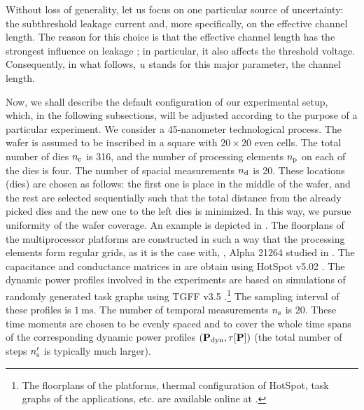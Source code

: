 Without loss of generality, let us focus on one particular source of uncertainty: the subthreshold leakage current and, more specifically, on the effective channel length. The reason for this choice is that the effective channel length has the strongest influence on leakage \cite{juan2011, juan2012}; in particular, it also affects the threshold voltage. Consequently, in what follows, $u$ stands for this major parameter, the channel length.



Now, we shall describe the default configuration of our experimental setup, which, in the following subsections, will be adjusted according to the purpose of a particular experiment. We consider a 45-nanometer technological process. The wafer is assumed to be inscribed in a square with $20 \times 20$ even cells. The total number of dies ${n_{\text{c}}}$ is 316, and the number of processing elements ${n_\text{p}}$ on each of the dies is four. The number of spacial measurements ${n_{\text{d}}}$ is 20. These locations (dies) are chosen as follows: the first one is place in the middle of the wafer, and the rest are selected sequentially such that the total distance from the already picked dies and the new one to the left dies is minimized. In this way, we pursue uniformity of the wafer coverage. An example is depicted in . The floorplans of the multiprocessor platforms are constructed in such a way that the processing elements form regular grids, as it is the case with, \eg, Alpha 21264 studied in \cite{juan2011}. The capacitance and conductance matrices in  are obtain using HotSpot v5.02 \cite{hotspot}. The dynamic power profiles involved in the experiments are based on simulations of randomly generated task graphs using TGFF v3.5 \cite{dick1998}.\footnote{The floorplans of the platforms, thermal configuration of HotSpot, task graphs of the applications, etc. are available online at \cite{sources}.} The sampling interval of these profiles is $1~\text{ms}$. The number of temporal measurements ${n_\text{s}}$ is 20. These time moments are chosen to be evenly spaced and to cover the whole time spans of the corresponding dynamic power profiles  $(\mathbf{P}_{\text{dyn}}, \tau[\mathbf{P}])$ (the total number of steps ${n_\text{s}'}$ is typically much larger).

